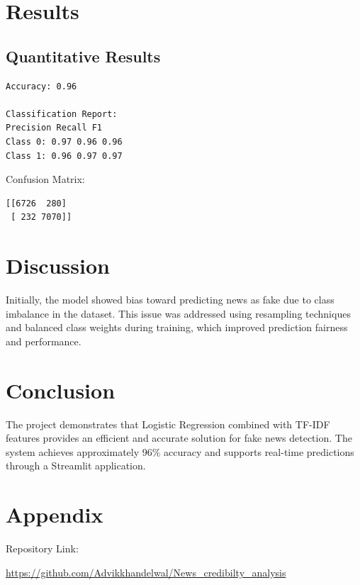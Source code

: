 \documentclass[conference]{IEEEtran}
\begin{document}
\section{Results}

\subsection{Quantitative Results}

\begin{verbatim}
Accuracy: 0.96

Classification Report:
Precision Recall F1
Class 0: 0.97 0.96 0.96
Class 1: 0.96 0.97 0.97
\end{verbatim}

Confusion Matrix:
\begin{verbatim}
[[6726  280]
 [ 232 7070]]
\end{verbatim}

\section{Discussion}

Initially, the model showed bias toward predicting news as fake
due to class imbalance in the dataset. This issue was addressed
using resampling techniques and balanced class weights during
training, which improved prediction fairness and performance.

\section{Conclusion}

The project demonstrates that Logistic Regression combined with
TF-IDF features provides an efficient and accurate solution for
fake news detection. The system achieves approximately 96\%
accuracy and supports real-time predictions through a Streamlit
application.

\section{Appendix}

Repository Link:

\begin{center}
\url{https://github.com/Advikkhandelwal/News_credibilty_analysis}
\end{center}
\end{document}
